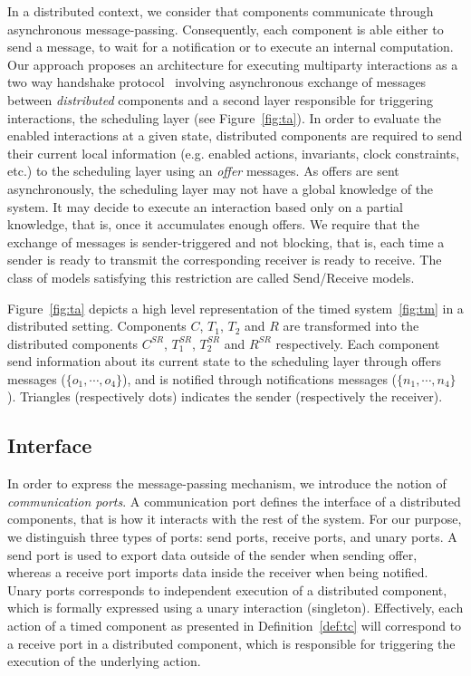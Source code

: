 In a distributed context, we consider that components communicate through asynchronous 
message-passing. Consequently, each component is able either to send a message, to wait for 
a notification or to execute an internal computation. Our approach proposes an architecture for 
executing multiparty interactions as a two way handshake protocol~\cite{} involving asynchronous 
exchange of messages between \emph{distributed} components and a second layer responsible for 
triggering interactions, the scheduling layer (see Figure~\ref{fig:ta}). 
In order to evaluate the enabled interactions at a given state, distributed components are 
required to send their current local information (e.g. enabled actions, invariants, 
clock constraints, etc.) to the scheduling layer using an \emph{offer} messages. 
As offers are sent asynchronously,  
the scheduling layer may not have a global knowledge of the system. It may decide to execute
an interaction based only on a partial knowledge, that is, once it accumulates enough offers.
We require that the exchange of messages is sender-triggered and not blocking, that is,
each time a sender is ready to transmit the corresponding receiver is ready to receive.
The class of models satisfying this restriction are called Send/Receive models.

\begin{example}
  Figure~\ref{fig:ta} depicts a high level representation of the timed system~\ref{fig:tm} in a 
  distributed setting. Components $C$, $T_1$, $T_2$ and $R$ are transformed into the distributed
  components $C^{SR}$, $T_1^{SR}$, $T_2^{SR}$ and $R^{SR}$ respectively. Each component send 
  information about its current state to the scheduling layer through offers messages
  ($\{o_1,\cdots,o_4\}$), and is notified through notifications messages ($\{n_1,\cdots,n_4\}$).
  Triangles (respectively dots) indicates the sender (respectively the receiver). 
\end{example}


\subsection{Interface}
In order to express the message-passing mechanism, we introduce the notion of 
\emph{communication ports}. A communication port defines the interface of a distributed 
components, that is how it interacts with the rest of the system. For our purpose, we distinguish
three types of ports: send ports, receive ports, and unary ports.
A send port is used to export data outside of the sender when sending offer, whereas
a receive port imports data inside the receiver  
when being notified. Unary ports corresponds to independent execution of a distributed 
component, which is formally expressed using a unary interaction (singleton). 
Effectively, each action of a timed component as presented in Definition~\ref{def:tc} 
will correspond to a receive port in a distributed component, which is responsible for triggering
the execution of the underlying action.

